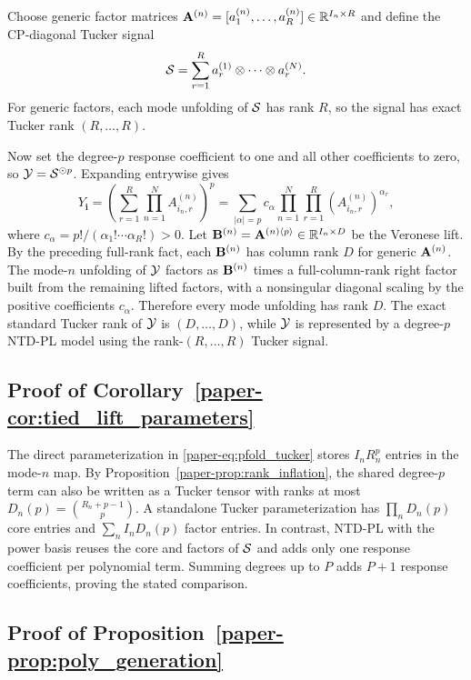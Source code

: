 Choose generic factor matrices
\(\mathbf{A}^{(n)}=[a_1^{(n)},\ldots,a_R^{(n)}]\in\mathbb{R}^{I_n\times R}\) and define the
CP-diagonal Tucker signal
\[
  \mathcal{S} =
  \sum_{r=1}^{R} a_r^{(1)}\otimes\cdots\otimes a_r^{(N)} .
\]
For generic factors, each mode unfolding of \(\mathcal{S}\) has rank \(R\), so the
signal has exact Tucker rank \((R,\ldots,R)\).

Now set the degree-\(p\) response coefficient to one and all other coefficients to
zero, so \(\mathcal{Y}=\mathcal{S}^{\odot p}\). Expanding entrywise gives
\[
  Y_{\mathbf{i}}
  =
  \left(
  \sum_{r=1}^{R}\prod_{n=1}^{N} A^{(n)}_{i_n,r}
  \right)^p
  =
  \sum_{|\alpha|=p}
  c_\alpha
  \prod_{n=1}^{N}
  \prod_{r=1}^{R}
  \left(A^{(n)}_{i_n,r}\right)^{\alpha_r},
\]
where \(c_\alpha=p!/(\alpha_1!\cdots\alpha_R!)>0\). Let
\(\mathbf{B}^{(n)}=\mathbf{A}^{(n)\langle p\rangle}\in\mathbb{R}^{I_n\times D}\) be the Veronese
lift. By the preceding full-rank fact, each \(\mathbf{B}^{(n)}\) has column rank
\(D\) for generic \(\mathbf{A}^{(n)}\). The mode-\(n\) unfolding of \(\mathcal{Y}\) factors
as \(\mathbf{B}^{(n)}\) times a full-column-rank right factor built from the
remaining lifted factors, with a nonsingular diagonal scaling by the positive
coefficients \(c_\alpha\). Therefore every mode unfolding has rank \(D\). The
exact standard Tucker rank of \(\mathcal{Y}\) is \((D,\ldots,D)\), while \(\mathcal{Y}\) is
represented by a degree-\(p\) NTD-PL model using the rank-\((R,\ldots,R)\)
Tucker signal.

\subsection{Proof of Corollary~\ref{paper-cor:tied_lift_parameters}}

The direct parameterization in \eqref{paper-eq:pfold_tucker} stores
$I_nR_n^p$ entries in the mode-$n$ map. By
Proposition~\ref{paper-prop:rank_inflation}, the shared degree-$p$ term can also
be written as a Tucker tensor with ranks at most
$D_n(p)=\binom{R_n+p-1}{p}$. A standalone Tucker parameterization has
$\prod_n D_n(p)$ core entries and $\sum_n I_nD_n(p)$ factor entries. In
contrast, NTD-PL with the power basis reuses the core and factors of
$\mathcal{S}$ and adds only one response coefficient per polynomial term. Summing degrees up to
$P$ adds $P+1$ response coefficients, proving the stated comparison.

\subsection{Proof of Proposition~\ref{paper-prop:poly_generation}}

